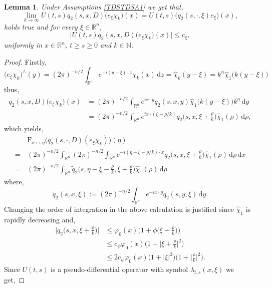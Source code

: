 \documentclass[a4paper, 12pt]{report}
\newtheorem{lemma}[theorem]{Lemma}
\theoremstyle{remark}
\theoremstyle{definition}
\begin{document}
\begin{lemma}\label{TDSSoAPL3}
Under Assumptions \ref{TDSTDSA1} we get that,
$$
\lim_{k \to \infty}U(t, s)q_2(s, x, D)\big(e_\xi\chi_k\big)(x) = U(t, s)\big(q_2(s, \cdot, \xi)e_\xi\big)(x),
$$
holds true and for every $\xi \in \mathbb{R}^n$,
$$
\big|U(t, s)q_2(s, x, D)\big(e_\xi\chi_k\big)(x)\big| \le c_\xi,
$$
uniformly in $x \in \mathbb{R}^n$, $t \ge s \ge 0$ and $k \in \mathbb{N}$.
\end{lemma}
\begin{proof}
Firstly,
$$
\big(e_\xi\chi_k\big)^\wedge(y) = (2\pi)^{-n/2}\int_{\mathbb{R}^n}e^{-i(y - \xi)\cdot z}\chi_k(x)\,\mathrm{d}z = \hat{\chi}_k(y - \xi) = k^n\hat{\chi}_1\big(k(y - \xi)\big)
$$
thus,
$$
\begin{aligned}
q_2(s, x, D)\big(e_\xi\chi_k\big)(x) & = (2\pi)^{-n/2}\int_{\mathbb{R}^n}e^{ix\cdot y}q_2(s, x, y)\hat{\chi}_1\big(k(y - \xi)\big)k^n\,\mathrm{d}y\\
& = (2\pi)^{-n/2}\int_{\mathbb{R}^n}e^{ix\cdot(\xi + \rho/k)}q_2\Big(s, x, \xi + \frac{\rho}{k}\Big)\hat{\chi}_1(\rho)\,\mathrm{d}\rho,
\end{aligned}
$$
which yields,
$$
\begin{aligned}
& \, \mathrm{F}_{x \mapsto \eta}\big(q_2(s, \cdot, D)(e_\xi\chi_k)\big)(\eta)\\
= & \, (2\pi)^{-n/2}\int_{\mathbb{R}^n}(2\pi)^{-n/2}\int_{\mathbb{R}^n}e^{-i(\eta - \xi - \rho/k)\cdot x}q_2\Big(s, x, \xi + \frac{\rho}{k}\Big)\hat{\chi}_1(\rho)\,\mathrm{d}\rho\,\mathrm{d}x\\
= & \, (2\pi)^{-n/2}\int_{\mathbb{R}^n}\tilde{q}_2\Big(s, \eta - \xi - \frac{\rho}{k}, \xi + \frac{\rho}{k}\Big)\hat{\chi}_1(\rho)\,\mathrm{d}\rho
\end{aligned}
$$
where,
$$
\tilde{q}_2(s, x, \xi) := (2\pi)^{-n/2}\int_{\mathbb{R}^n}e^{-ix\cdot y}q_2(s, y, \xi)\,\mathrm{d}y.
$$
Changing the order of integration in the above calculation is justified since $\hat{\chi}_1$ is rapidly decreasing and,
$$
\begin{aligned}
\Big|q_2\Big(s, x, \xi + \frac{\rho}{k}\Big)\Big| & \le \varphi_0(x)\bigg(1 + \phi\Big(\xi + \frac{\rho}{k}\Big)\bigg)\\
& \le c_\psi\varphi_0(x)\bigg(1 + \Big|\xi + \frac{\rho}{k}\Big|^2\bigg)\\
& \le 2c_\psi\varphi_0(x)\big(1 + |\xi|^2\big)\bigg(1 + \Big|\frac{\rho}{k}\Big|^2\bigg).
\end{aligned}
$$
Since $U(t, s)$ is a pseudo-differential operator with symbol $\lambda_{t, s}(x, \xi)$ we get,

\end{proof}
\end{document}
